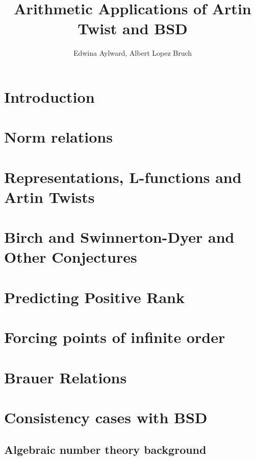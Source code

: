 \documentclass{article}
\title{Arithmetic Applications of Artin Twist and BSD}
\author{Edwina Aylward, Albert Lopez Bruch}
\theoremstyle{plain}
\theoremstyle{definition}
\begin{document}
	\maketitle
	\newpage
	\tableofcontents
	\newpage

\section*{Introduction}


\newpage
\section{Norm relations}



\newpage
\section{Representations, L-functions and Artin Twists}


\section{Birch and Swinnerton-Dyer and Other Conjectures}


\section{Predicting Positive Rank}


\newpage
\section{Forcing points of infinite order}



\section{Brauer Relations}

\section{Consistency cases with BSD}


\begin{appendices}
\section{Algebraic number theory background}


\end{appendices}

\newpage



\end{document}
